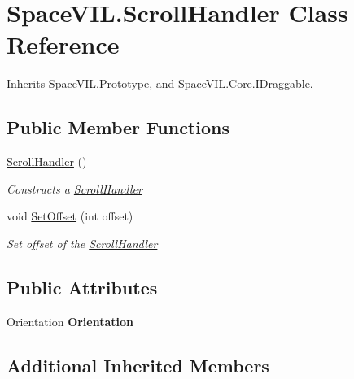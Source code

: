 \hypertarget{class_space_v_i_l_1_1_scroll_handler}{}\section{Space\+V\+I\+L.\+Scroll\+Handler Class Reference}
\label{class_space_v_i_l_1_1_scroll_handler}


Inherits \mbox{\hyperlink{class_space_v_i_l_1_1_prototype}{Space\+V\+I\+L.\+Prototype}}, and \mbox{\hyperlink{interface_space_v_i_l_1_1_core_1_1_i_draggable}{Space\+V\+I\+L.\+Core.\+I\+Draggable}}.

\subsection*{Public Member Functions}
\begin{DoxyCompactItemize}
\item 
\mbox{\hyperlink{class_space_v_i_l_1_1_scroll_handler_a95452d5c586be5d21542dd743639cd62}{Scroll\+Handler}} ()
\begin{DoxyCompactList}\small\item\em Constructs a \mbox{\hyperlink{class_space_v_i_l_1_1_scroll_handler}{Scroll\+Handler}} \end{DoxyCompactList}\item 
void \mbox{\hyperlink{class_space_v_i_l_1_1_scroll_handler_abce983699a4e1e947d6e6b8f91a97080}{Set\+Offset}} (int offset)
\begin{DoxyCompactList}\small\item\em Set offset of the \mbox{\hyperlink{class_space_v_i_l_1_1_scroll_handler}{Scroll\+Handler}} \end{DoxyCompactList}\end{DoxyCompactItemize}
\subsection*{Public Attributes}
\begin{DoxyCompactItemize}
\item 
\mbox{\label{class_space_v_i_l_1_1_scroll_handler_a184a58ef8c4cfe2718a7b8131977c4e9}} 
Orientation {\bfseries Orientation}
\end{DoxyCompactItemize}
\subsection*{Additional Inherited Members}


